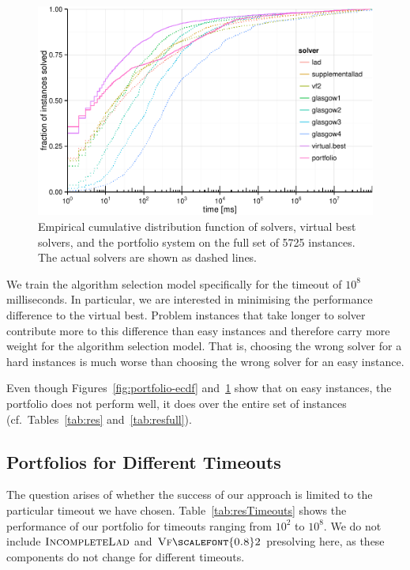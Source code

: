 \documentclass{llncs}
\newcommand{\VFtwo}{$\textsc{Vf{\scalefont{0.8}2}}$\xspace}
\newcommand{\IncompleteLAD}{$\textsc{IncompleteLad}$\xspace}
\begin{document}
\begin{figure}[!ht]
\includegraphics[width=\textwidth]{figures/portfolio-ecdf-full}
\caption{Empirical cumulative distribution function of solvers, virtual best
solvers, and the portfolio system on the full set of 5725 instances. The
actual solvers are shown as dashed lines.}
\label{fig:portfolio-ecdf-full}
\end{figure}

We train the algorithm selection model specifically for the timeout of $10^8$
milliseconds. In particular, we are interested in minimising the performance
difference to the virtual best. Problem instances that take longer to solver
contribute more to this difference than easy instances and therefore carry more
weight for the algorithm selection model. That is, choosing the wrong solver for
a hard instances is much worse than choosing the wrong solver for an easy
instance.

Even though Figures~\ref{fig:portfolio-ecdf} and~\ref{fig:portfolio-ecdf-full}
show that on easy instances, the portfolio does not perform well, it does over
the entire set of instances (cf.\ Tables~\ref{tab:res} and~\ref{tab:resfull}).

\subsection{Portfolios for Different Timeouts}

The question arises of whether the success of our approach is limited to the
particular timeout we have chosen. Table~\ref{tab:resTimeouts} shows the
performance of our portfolio for timeouts ranging from $10^2$ to $10^8$. We
do not include \IncompleteLAD and \VFtwo presolving here, as these components do not
change for different timeouts.
\end{document}
